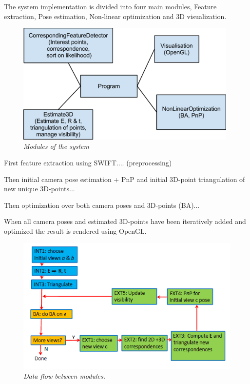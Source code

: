 The system implementation is divided into four main modules, Feature extraction, Pose estimation, Non-linear optimization and 3D visualization.

\begin{figure}[htb]
	\centering
	\includegraphics[width=110mm]{images/system_modules.png}
	\caption{\textit{Modules of the system}}
	\label{fig:block_overview2_fig}  %
\end{figure}

First feature extraction using SWIFT.... (preprocessing)

Then initial camera pose estimation + PnP and initial 3D-point triangulation of new unique 3D-points...

Then optimization over both camera poses and 3D-points (BA)...

When all camera poses and estimated 3D-points have been iteratively added and optimized the result is rendered using OpenGL.

\begin{figure}[htb]
	\centering
	\includegraphics[width=120mm]{images/data_flow.png}
	\caption{\textit{Data flow between modules.}}
	\label{fig:block_overview_fig}  %
\end{figure}
